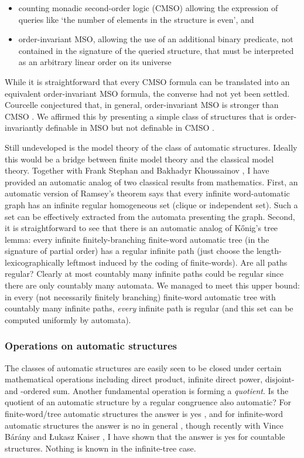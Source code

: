 \documentclass[11pt]{article}
\theoremstyle{plain} \numberwithin{equation}{section}
\theoremstyle{definition}
\begin{document}
\begin{itemize}
\item counting monadic second-order logic (CMSO) allowing the expression of queries like `the number of elements in the structure is even', and
\item order-invariant MSO, allowing the use of an additional binary predicate, not contained in the signature of the queried structure, that must be interpreted as an arbitrary linear order on its universe
\end{itemize}
\noindent
While it is straightforward that every CMSO formula can be translated into an equivalent order-invariant MSO formula, the converse had not yet been settled. Courcelle conjectured that, in general, order-invariant MSO is stronger than CMSO \cite{Cour96}. We affirmed this by presenting a simple class of structures that is order-invariantly definable in MSO but not definable in CMSO \cite{GaRu08}.

Still undeveloped is the model theory of the class of automatic structures. Ideally this would be a bridge between finite model theory and the classical model theory.
Together with Frank Stephan and Bakhadyr Khoussainov \cite{KRS05}, I have provided an automatic analog of two classical results from mathematics. First, an automatic version of Ramsey's theorem says that every infinite word-automatic graph has an infinite regular homogeneous set (clique or independent set). Such a set can be effectively extracted from the automata presenting the graph. Second, it is straightforward to see that there is an automatic analog of K\H{o}nig's tree lemma: every infinite finitely-branching finite-word automatic tree (in the signature of partial order) has a regular infinite path (just choose the length-lexicographically leftmost induced by the coding of finite-words). Are all paths regular? Clearly at most countably many infinite paths could be regular since there are only countably many automata. We managed to meet this upper bound: in every (not necessarily finitely branching) finite-word automatic tree with countably many infinite paths, {\it every} infinite path is regular (and this set can be computed uniformly by automata).

\noindent
\subsubsection*{Operations on automatic structures}
The classes of automatic structures are easily seen to be closed under certain mathematical operations including direct product, infinite direct power, disjoint- and -ordered sum. Another fundamental operation is forming a {\it quotient}.
Is the quotient of an automatic structure by a regular congruence also automatic? For finite-word/tree automatic structures the answer is yes \cite{Blum99} \cite{CoLo06}, and for infinite-word automatic structures the answer is no in general \cite{HKMN07}, though recently with Vince B{\'a}r{\'a}ny and {\L}ukasz Kaiser \cite{BKRu08}, I have shown that the answer is yes for countable structures. Nothing is known in the infinite-tree case.
\end{document}
